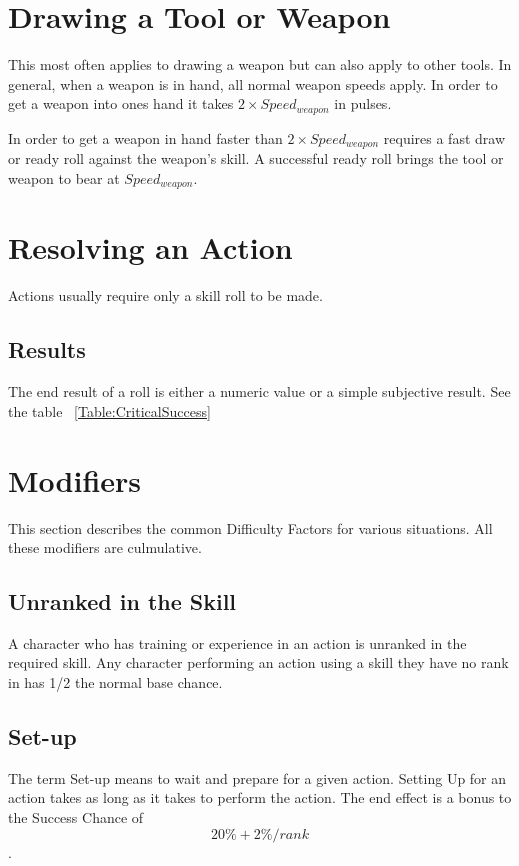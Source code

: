 \section{Drawing a Tool or Weapon}

This most often applies to drawing a weapon but can also apply to 
other tools. In general, when a weapon is in hand, all normal weapon 
speeds apply. In order to get a weapon into ones hand it takes 
\( 2 \times Speed_{weapon} \) in pulses. 

In order to get a weapon in hand faster than \( 2 \times 
Speed_{weapon} \) requires a fast draw or ready roll against the weapon's 
skill. A successful ready roll brings the tool or weapon to bear at 
\( Speed_{weapon} \).  

\section{Resolving an Action}
Actions usually require only a skill roll to be made. 

\subsection{Results}

The end result of a roll is either a numeric value or a simple 
subjective result. See the table ~\ref{Table:CriticalSuccess}

\section{Modifiers} 

This section describes the common Difficulty Factors for various 
situations. All these modifiers are culmulative.

\subsection{Unranked in the Skill}

A character who has training or experience in an action is
unranked in the required skill. Any character performing an action using 
a skill they have no rank in has 1/2 the normal base chance. 

\subsection{Set-up}

The term Set-up means to wait and prepare for a given action. Setting Up for
an action takes as long as it takes to perform the action. The end effect is a
bonus to the Success Chance of \[ 20\% + 2\%/rank\]. 

